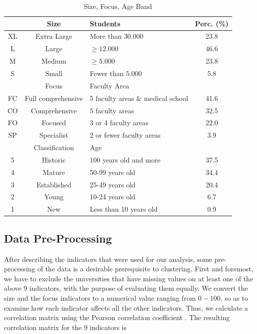 \documentclass[conference]{IEEEtran}
\begin{document}
\begin{table}[ht]
    \begin{center}
        \caption{Size, Focus, Age Band}
        \renewcommand{\arraystretch}{1.25}
        \begin{tabular}{ |c|c|p{3.2cm}|c| } 
            \hline
            & Size & Students & Perc. (\%) \\
            \hline
            XL & Extra Large & More than \(30.000\) & 23.8 \\
            L & Large        & \(\geq 12.000\)  & 46.6  \\ 
            M & Medium       & \(\geq 5.000\)  & 23.8  \\ 
            S & Small        & Fewer than \(5.000\)  & 5.8 \\
            \hline
            & Focus & Faculty Area & \\
            \hline
            FC & Full comprehensive & 5 faculty areas \& medical school & 41.6 \\ 
            CO & Comprehensive      & 5 faculty areas & 32.5\\ 
            FO & Focused            & 3 or 4 faculty areas & 22.0 \\ 
            SP & Specialist         & 2 or fewer faculty areas & 3.9 \\
            \hline
            & Classification & Age & \\
            \hline
            5 &	Historic    &	100 years old and more & 37.5\\
            4 &	Mature      &	50-99 years old & 34.4\\
            3 &	Established & 	25-49 years old & 20.4\\
            2 &	Young       &	10-24 years old & 6.7\\
            1 &	New         &	Less than 10 years old & 0.9\\
            \hline
        \end{tabular}
    \end{center}
\end{table}

\subsection{Data Pre-Processing}

After describing the indicators that were used for our analysis, some pre-processing of the data is a desirable prerequisite to clustering. First and foremost, we have to exclude the universities that have missing values on at least one of the above 9 indicators, with the purpose of evaluating them equally. We convert the size and the focus indicators to a numerical value ranging from \(0 - 100\), so as to examine how each indicator affects all the other indicators. Thus, we calculate a correlation matrix using the Pearson correlation coefficient \cite{b6}. The resulting correlation matrix for the 9 indicators is
\end{document}
